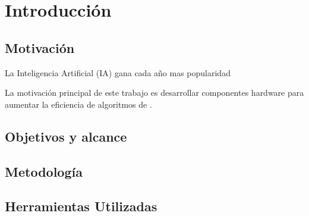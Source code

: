 \chapter{Introducción}

\section{Motivación}

La Inteligencia Artificial (IA) gana cada año mas popularidad


La motivación principal de este trabajo es desarrollar componentes hardware para aumentar la eficiencia de algoritmos de .

\section{Objetivos y alcance}

\section{Metodología}

\section{Herramientas Utilizadas}
